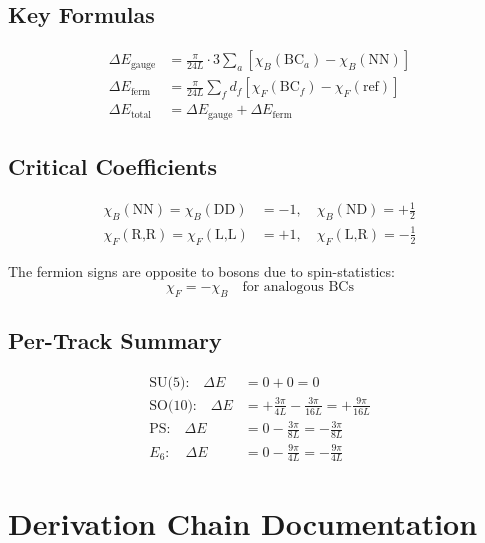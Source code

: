 \documentclass[11pt,a4paper]{article}
\begin{document}
\subsection{Key Formulas}

\begin{align}
\label{eq:key-gauge}
\Delta E_{\text{gauge}} &= \frac{\pi}{24L} \cdot 3 \sum_a [\chi_B(\text{BC}_a) - \chi_B(\text{NN})] \\
\label{eq:key-fermion}
\Delta E_{\text{ferm}} &= \frac{\pi}{24L} \sum_f d_f [\chi_F(\text{BC}_f) - \chi_F(\text{ref})] \\
\label{eq:key-total}
\Delta E_{\text{total}} &= \Delta E_{\text{gauge}} + \Delta E_{\text{ferm}}
\end{align}

\subsection{Critical Coefficients}

\begin{align}
\label{eq:key-chi-B}
\chi_B(\text{NN}) = \chi_B(\text{DD}) &= -1, \quad \chi_B(\text{ND}) = +\frac{1}{2} \\
\label{eq:key-chi-F}
\chi_F(\text{R,R}) = \chi_F(\text{L,L}) &= +1, \quad \chi_F(\text{L,R}) = -\frac{1}{2}
\end{align}

The fermion signs are opposite to bosons due to spin-statistics:
\begin{equation}
\label{eq:key-opposite}
\chi_F = -\chi_B \quad \text{for analogous BCs}
\end{equation}

\subsection{Per-Track Summary}

\begin{align}
\label{eq:sum-su5}
\text{SU(5):} \quad \Delta E &= 0 + 0 = 0 \\
\label{eq:sum-so10}
\text{SO(10):} \quad \Delta E &= +\frac{3\pi}{4L} - \frac{3\pi}{16L} = +\frac{9\pi}{16L} \\
\label{eq:sum-ps}
\text{PS:} \quad \Delta E &= 0 - \frac{3\pi}{8L} = -\frac{3\pi}{8L} \\
\label{eq:sum-e6}
E_6: \quad \Delta E &= 0 - \frac{9\pi}{4L} = -\frac{9\pi}{4L}
\end{align}

\section{Derivation Chain Documentation}
\label{app:chain}
\end{document}
